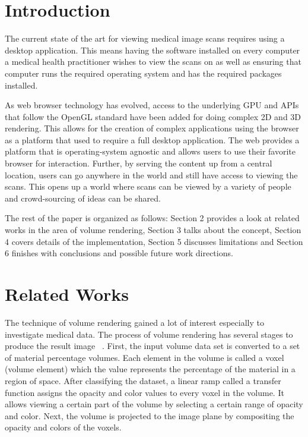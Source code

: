 \documentclass{acm_proc_article-sp}
\begin{document}
\maketitle
\begin{abstract}
\end{abstract}


\section{Introduction}
The current state of the art for viewing medical image scans requires using a desktop application.  This means having the software installed on every computer a medical health practitioner wishes to view the scans on as well as ensuring that computer runs the required operating system and has the required packages installed. 

As web browser technology has evolved, access to the underlying GPU and APIs that follow the OpenGL standard have been added for doing complex 2D and 3D rendering.  This allows for the creation of complex applications using the browser as a platform that used to require a full desktop application.  The web provides a platform that is operating-system agnostic and allows users to use their favorite browser for interaction.  Further, by serving the content up from a central location, users can go anywhere in the world and still have access to viewing the scans.  This opens up a world where scans can be viewed by a variety of people and crowd-sourcing of ideas can be shared.

The rest of the paper is organized as follows: Section 2 provides a look at related works in the area of volume rendering, Section 3 talks about the concept, Section 4 covers details of the implementation, Section 5 discusses limitations and Section 6 finishes with conclusions and possible future work directions.

\section{Related Works}
The technique of volume rendering gained a lot of interest especially to investigate medical data. The process of volume rendering has several stages to produce the result image ~\cite{drebin:1988}. First, the input volume data set is converted to a set of material percentage volumes. Each element in the volume is called a voxel (volume element) which the value represents the percentage of the material in a region of space. After classifying the dataset, a linear ramp called a transfer function assigns the opacity and color values to every voxel in the volume. It allows viewing a certain part of the volume by selecting a certain range of opacity and color. Next, the volume is projected to the image plane by compositing the opacity and colors of the voxels. 
\end{document}
